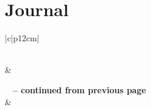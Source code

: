 \chapter{Journal}
\begin{center}
\begin{longtable}{|c|p{12cm}|}
\caption[Journal]{Journal} \label{table:journal} \\

\hline {} &  \\ \hline 
\endfirsthead

%
{{\bfseries \tablename\ \thetable{} -- continued from previous page}} \\
\hline {} &
 \\
\endhead

\hline {} \\ \hline
\endfoot


\end{longtable}
\end{center}
